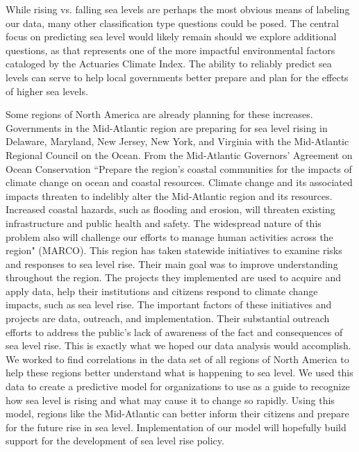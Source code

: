 \documentclass[12pt]{report}
\begin{document}
\par While rising vs. falling sea levels are perhaps the most obvious means of labeling our data, many other classification type questions could be posed. The central focus on predicting sea level would likely remain should we explore additional questions, as that represents one of the more impactful environmental factors cataloged by the Actuaries Climate Index. The ability to reliably predict sea levels can serve to help local governments better prepare and plan for the effects of higher sea levels.
\par Some regions of North America are already planning for these increases. Governments in the Mid-Atlantic region are preparing for sea level rising in Delaware, Maryland, New Jersey, New York, and Virginia with the Mid-Atlantic Regional Council on the Ocean. From the Mid‐Atlantic Governors' Agreement on Ocean Conservation \textquotedblleft Prepare the region’s coastal communities for the impacts of climate change on ocean and coastal resources. Climate change and its associated impacts threaten to indelibly alter the Mid‐Atlantic region and its resources. Increased coastal hazards, such as flooding and erosion, will threaten existing infrastructure and public health and safety. The widespread nature of this problem also will challenge our efforts to manage human activities across the region" (MARCO). This region has taken statewide initiatives to examine risks and responses to sea level rise. Their main goal was to improve understanding throughout the region. The projects they implemented are used to acquire and apply data, help their institutions and citizens respond to climate change impacts, such as sea level rise. The important factors of these initiatives and projects are data, outreach, and implementation. Their substantial outreach efforts to address the public’s lack of awareness of the fact and consequences of sea level rise. This is exactly what we hoped our data analysis would accomplish. We worked to find correlations in the data set of all regions of North America to help these regions better understand what is happening to sea level. We used this data to create a predictive model for organizations to use as a guide to recognize how sea level is rising and what may cause it to change so rapidly. Using this model, regions like the Mid-Atlantic can better inform their citizens and prepare for the future rise in sea level. Implementation of our model will hopefully build support for the development of sea level rise policy. 
\end{document}
